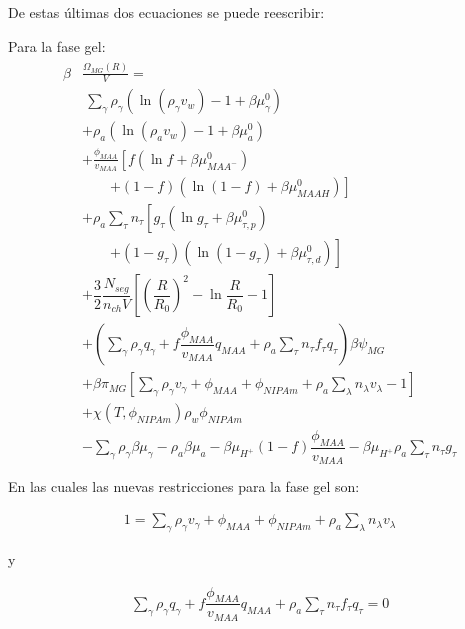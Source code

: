 De estas \'ultimas dos ecuaciones se puede reescribir:

Para la fase gel:
\begin{align}
	\begin{aligned}
		\beta&\frac{\Omega_{MG}(R)}{V}=\\
		& ~ \sum_{\gamma} \rho_\gamma\left(\ln\left(\rho_\gamma v_w\right) -1 + \beta\mu^0_\gamma\right) \\
		&+ \rho_a\left(\ln\left(\rho_a v_w\right) -1 + \beta\mu^0_a\right) \\
		& + \frac{\phi_{MAA}}{v_{MAA}} \left[f(\ln f+ \beta\mu^0_{MAA^-})\right.\\
		&\qquad\left.+(1-f)(\ln (1-f)+\beta\mu^0_{MAAH})\right] \\
		& + \rho_a \sum_\tau n_\tau  \left[g_\tau(\ln g_\tau+ \beta\mu^0_{\tau,p})\right.\\
		&\qquad\left.+(1-g_\tau)(\ln (1-g_\tau)+\beta\mu^0_{\tau,d})\right] \\
		& + \dfrac{3}{2}\dfrac{N_{seg}}{n_{ch} V}\left[\left(\dfrac{R}{R_0}\right)^2 - \ln\dfrac{R}{R_0} -1\right] \\
		& +  \left(\sum_{\gamma } {\rho_\gamma q_\gamma + f\dfrac{\phi_{MAA}}{v_{MAA}}q_{MAA}} + \rho_a \sum_\tau n_\tau f_\tau q_\tau \right)\beta\psi_{MG}\\
		& +\beta\pi_{MG} \left[ \sum_{\gamma } \rho_\gamma v_\gamma  + \phi_{MAA} + \phi_{NIPAm} + \rho_a \sum_\lambda n_\lambda v_\lambda -1 \right] \\
		& + \chi (T, \phi_{NIPAm})\rho_w \phi_{NIPAm} \\
		& -\sum_{\gamma }{\rho_\gamma\beta\mu_\gamma} -\rho_a\beta\mu_a
		-\beta\mu_{H^+}(1-f)\dfrac{\phi_{MAA}}{v_{MAA}} 
		-\beta\mu_{H^+} \rho_a \sum_\tau n_\tau g_\tau\\
	\end{aligned}
	\label{eq:gel:total}
\end{align}
En las cuales las nuevas restricciones para la fase gel son:

\begin{align}
	1 = \sum_{\gamma } \rho_\gamma v_\gamma  + \phi_{MAA} + \phi_{NIPAm} + \rho_a \sum_\lambda n_\lambda v_\lambda
	\label{eq:gel:packing-g-total}
\end{align}

y 

\begin{align}
	\sum_{\gamma } {\rho_\gamma q_\gamma + f\dfrac{\phi_{MAA}}{v_{MAA}}q_{MAA}} + \rho_a \sum_\tau n_\tau f_\tau q_\tau = 0
\end{align}

